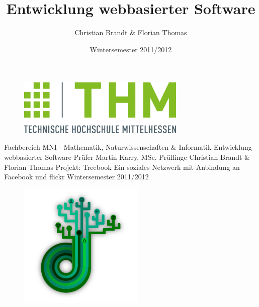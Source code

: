 \documentclass[10pt,a4paper]{book}
\author{Christian Brandt & Florian Thomas}
\title{Entwicklung webbasierter Software}
\date{Wintersemester 2011/2012}
\begin{document}
\begin{titlepage}
\begin{center}
\begin{figure}[htbp]
\centering
\includegraphics[width=8cm]{Pictures/THM_Logo.png}%
\end{figure}
\large{Fachbereich MNI - Mathematik, Naturwissenschaften \& Informatik}
\linebreak 
\linebreak
\linebreak
\linebreak
\linebreak
\linebreak
\linebreak
\LARGE{Entwicklung webbasierter Software}
\linebreak
\linebreak
\linebreak
\linebreak
\linebreak
\linebreak
\linebreak
\large{Prüfer}
\linebreak
\large{Martin Karry, MSc.}
\linebreak
\linebreak
\large{Prüflinge}
\linebreak
\large{Christian Brandt \& Florian Thomas}
\linebreak
\linebreak
\linebreak
\linebreak
\Large{Projekt: Treebook}
\linebreak
\normalsize{Ein soziales Netzwerk mit Anbindung an Facebook und flickr}
\linebreak
\linebreak
\normalsize{Wintersemester 2011/2012}
\begin{figure}[htbp]
\centering
\includegraphics[width=6cm]{Pictures/treebook_treelogo.png}%
\end{figure}
\linebreak
\linebreak
\linebreak
\linebreak
\end{center}

\end{titlepage}
\end{document}
